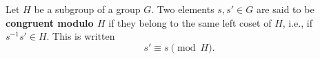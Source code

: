 Let $H$ be a subgroup of a group $G$. Two elements $s, s' \in G$ are said to be \textbf{congruent modulo $H$} if they belong to the same left coset of $H$, i.e., if $s^{-1}s' \in H$. This is written
$$s' \equiv s \pmod{H}.$$

